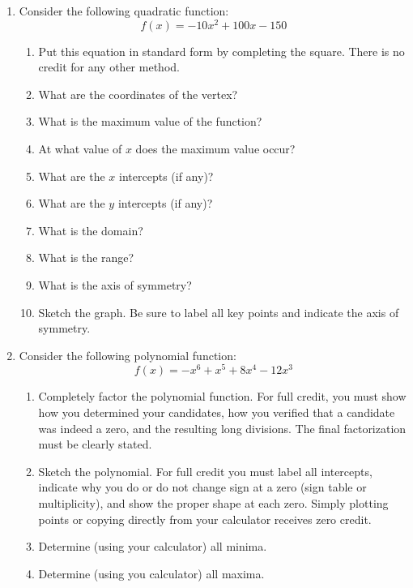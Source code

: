 \documentclass[letterpaper,12pt,fleqn]{article}
\begin{document}
\begin{enumerate}
\item Consider the following quadratic function:
  \[f(x)=-10x^2+100x-150\]
  \begin{enumerate}
  \item Put this equation in standard form by completing the square. There
    is no credit for any other method.
  \item What are the coordinates of the vertex?
  \item What is the maximum value of the function?
  \item At what value of $x$ does the maximum value occur?
  \item What are the $x$ intercepts (if any)?
  \item What are the $y$ intercepts (if any)?
  \item What is the domain?
  \item What is the range?
  \item What is the axis of symmetry?
  \item Sketch the graph. Be sure to label all key points and indicate the
    axis of symmetry.
  \end{enumerate}
\newpage
\item Consider the following polynomial function:
  \[f(x)=-x^6+x^5+8x^4-12x^3\]
  \begin{enumerate}
  \item Completely factor the polynomial function. For full credit, you must
    show how you determined your candidates, how you verified that a candidate
    was indeed a zero, and the resulting long divisions. The final
    factorization must be clearly stated.
  \item Sketch the polynomial. For full credit you must label all intercepts,
    indicate why you do or do not change sign at a zero (sign table or
    multiplicity), and show the proper shape at each zero. Simply plotting
    points or copying directly from your calculator receives zero credit.
  \item Determine (using your calculator) all minima.
  \item Determine (using you calculator) all maxima.
  \end{enumerate}
\end{enumerate}
\end{document}
